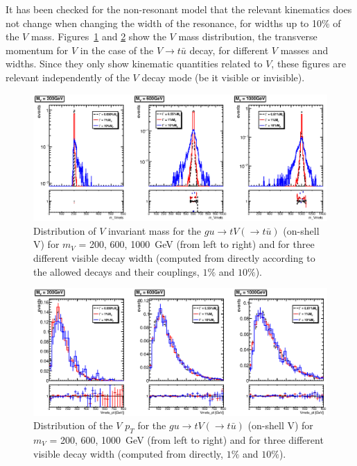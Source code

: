 It has been checked for the non-resonant model that the relevant kinematics 
does not change when changing 
the width of the resonance, for widths up to 10\% of the $V$ mass. 
Figures~\ref{fig:appB:Vmass} and \ref{fig:appB:pTV} show 
the $V$ mass distribution, the transverse momentum for $V$ 
in the case of the $V\to t\bar{u}$ decay, for different $V$ masses and widths.
Since they only show kinematic quantities related to $V$, these figures are relevant independently of the $V$ decay mode (be it visible or invisible). 
\begin{figure}[!h!tpd]
	\centering
	\includegraphics[width=1.0\textwidth]{figures/singletop/m_Vmets}
	\caption{
		Distribution of $V$ invariant mass for the $gu\to tV(\to t\bar{u})$ (on-shell V) 
		for $m_V$ = {200, 600, 1000}~GeV (from left to right) and for three different
		visible decay width (computed from \madgraph directly according to the allowed decays and their couplings, $1\%$ and $10\%$).
	}   
	\label{fig:appB:Vmass}
\end{figure}


\begin{figure}[!h!tpd]
	\centering
	\includegraphics[width=1.0\textwidth]{figures/singletop/Vmets_pt}
	\caption{
		Distribution of the $V$ $p_T$ for the $gu\to tV(\to t\bar{u})$ (on-shell V) for $m_V$ = {200, 600, 1000}~GeV (from left to right) and for three different
		visible decay width (computed from \madgraph directly, $1\%$ and $10\%$).
	}
	\label{fig:appB:pTV}
\end{figure}


